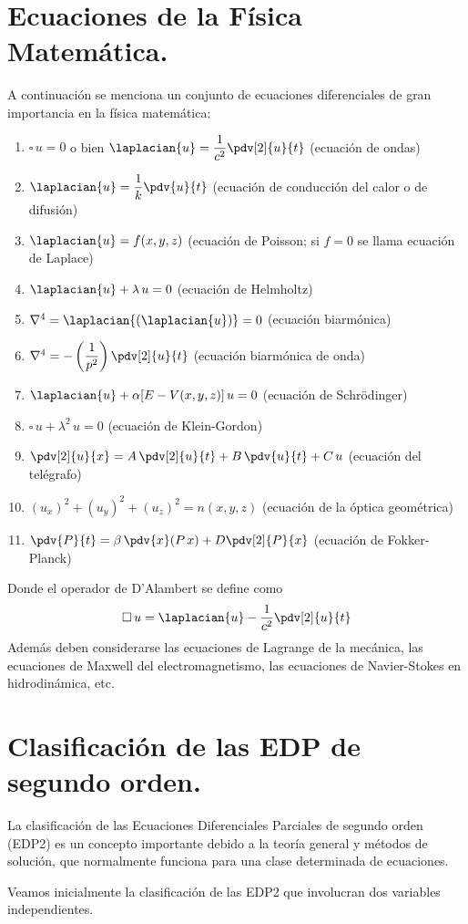\section{Ecuaciones de la Física Matemática.}
A continuación se menciona un conjunto de ecuaciones diferenciales de gran importancia en la física matemática:
\begin{enumerate}[label=\alph*)]
\item $\square \, u = 0$ o bien $\laplacian{u} = \dfrac{1}{c^{2}} \displaystyle \pdv[2]{u}{t}$ (ecuación de ondas)
\item $\laplacian{u} = \dfrac{1}{k} \displaystyle \pdv{u}{t}$ (ecuación de conducción del calor o de difusión)
\item $\laplacian{u} = f(x, y, z)$ (ecuación de Poisson; si $f=0$ se llama ecuación de Laplace)
\item $\laplacian{u} + \lambda \, u = 0$ (ecuación de Helmholtz)
\item $\nabla^{4} = \laplacian{(\laplacian{u})} = 0$ (ecuación biarmónica)
\item $\nabla^{4} = - \left( \dfrac{1}{p^{2}} \right) \displaystyle \pdv[2]{u}{t}$ (ecuación biarmónica de onda)
\item $\laplacian{u} + \alpha [E - V(x, y, z)] \, u = 0$ (ecuación de Schrödinger)
\item $\square \, u + \lambda^{2} \, u = 0$ (ecuación de Klein-Gordon)
\item $\displaystyle \pdv[2]{u}{x} = A \, \displaystyle \pdv[2]{u}{t} + B \, \displaystyle \pdv{u}{t} + C \, u$ (ecuación del telégrafo)
\item $(u_{x})^{2} + (u_{y})^{2} + (u_{z})^{2} =  n (x, y, z)$ (ecuación de la óptica geométrica)
\item $\displaystyle \pdv{P}{t} = \beta \, \displaystyle \pdv{x} (P \, x) +  D \displaystyle \pdv[2]{P}{x}$ (ecuación de Fokker-Planck)
\end{enumerate}
Donde el operador de D'Alambert se define como
\begin{align*}
\square \, u = \laplacian{u} - \dfrac{1}{c^{2}} \pdv[2]{u}{t}
\end{align*}
Además deben considerarse las ecuaciones de Lagrange de la mecánica, las ecuaciones de Maxwell del electromagnetismo, las ecuaciones de Navier-Stokes en hidrodinámica, etc.
\section{Clasificación de las EDP de segundo orden.}
La clasificación de las Ecuaciones Diferenciales Parciales de segundo orden (EDP2) es un concepto importante debido a la teoría general y métodos de solución, que normalmente funciona para una clase determinada de ecuaciones. 
\par
Veamos inicialmente la clasificación de las EDP2 que involucran dos variables independientes.
